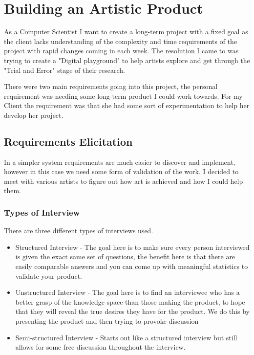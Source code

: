 \documentclass[a4paper]{report}
\begin{document}
\section{Building an Artistic Product}
As a Computer Scientist I want to create a long-term project with a fixed goal as the client lacks understanding of the complexity and time requirements of the project with rapid changes coming in each week. The resolution I came to was trying to create a "Digital playground" to help artists explore and get through the "Trial and Error" stage of their research.

There were two main requirements going into this project, the personal requirement was needing some long-term product I could work towards. For my Client the requirement was that she had some sort of experimentation to help her develop her project.

\subsection{Requirements Elicitation}
In a simpler system requirements are much easier to discover and implement, however in this case we need some form of validation of the work. I decided to meet with various artists to figure out how art is achieved and how I could help them.

\subsubsection{Types of Interview}
There are three different types of interviews used.

\begin{itemize}
\item Structured Interview - The goal here is to make sure every person interviewed is given the exact same set of questions, the benefit here is that there are easily comparable answers and you can come up with meaningful statistics to validate your product.

\item Unstructured Interview - The goal here is to find an interviewee who has a better grasp of the knowledge space than those making the product, to hope that they will reveal the true desires they have for the product. We do this by presenting the product and then trying to provoke discussion

\item Semi-structured Interview - Starts out like a structured interview but still allows for some free discussion throughout the interview.
\end{itemize}
\end{document}
